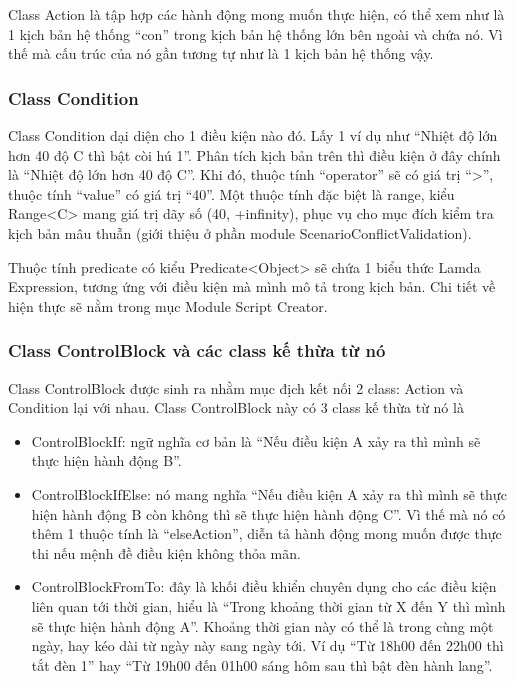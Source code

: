 \documentclass[12pt,a4paper,oneside]{extbook}
\begin{document}
Class Action là tập hợp các hành động mong muốn thực hiện, có thể xem như là 1 kịch bản hệ thống “con” trong kịch bản hệ thống lớn bên ngoài và chứa nó. Vì thế mà cấu trúc của nó gần tương tự như là 1 kịch bản hệ thống vậy.

\subsubsection{Class Condition}

Class Condition dại diện cho 1 điều kiện nào đó. Lấy 1 ví dụ như “Nhiệt độ lớn hơn 40 độ C thì bật còi hú 1”. Phân tích kịch bản trên thì điều kiện ở đây chính là “Nhiệt độ lớn hơn 40 độ C”. Khi đó, thuộc tính “operator” sẽ có giá trị “>”, thuộc tính “value” có giá trị “40”. Một thuộc tính đặc biệt là range, kiểu Range<C> mang giá trị dãy số (40, +infinity), phục vụ cho mục đích kiểm tra kịch bản mâu thuẫn (giới thiệu ở phần module ScenarioConflictValidation).

Thuộc tính predicate có kiểu Predicate<Object> sẽ chứa 1 biểu thức Lamda Expression, tương ứng với điều kiện mà mình mô tả trong kịch bản. Chi tiết về hiện thực sẽ nằm trong mục Module Script Creator.

\subsubsection{Class ControlBlock và các class kế thừa từ nó}

Class ControlBlock được sinh ra nhằm mục địch kết nối 2 class: Action và Condition lại với nhau. Class ControlBlock này có 3 class kế thừa từ nó là

	\begin{itemize} [topsep=1mm,itemsep=-0.5mm]
	\item ControlBlockIf: ngữ nghĩa cơ bản là “Nếu điều kiện A xảy ra thì mình sẽ thực hiện hành động B”.
	\item ControlBlockIfElse: nó mang nghĩa “Nếu điều kiện A xảy ra thì mình sẽ thực hiện hành động B còn không thì sẽ thực hiện hành động C”. Vì thế mà nó có thêm 1 thuộc tính là “elseAction”, diễn tả hành động mong muốn được thực thi nếu mệnh đề điều kiện không thỏa mãn.
	\item ControlBlockFromTo: đây là khối điều khiển chuyên dụng cho các điều kiện liên quan tới thời gian, hiểu là “Trong khoảng thời gian từ X đến Y thì mình sẽ thực hiện hành động A”. Khoảng thời gian này có thể là trong cùng một ngày, hay kéo dài từ ngày này sang ngày tới. Ví dụ “Từ 18h00 đến 22h00 thì tắt đèn 1” hay “Từ 19h00 đến 01h00 sáng hôm sau thì bật đèn hành lang”.
	\vspace{1mm}
	\end{itemize}
	
\end{document}
